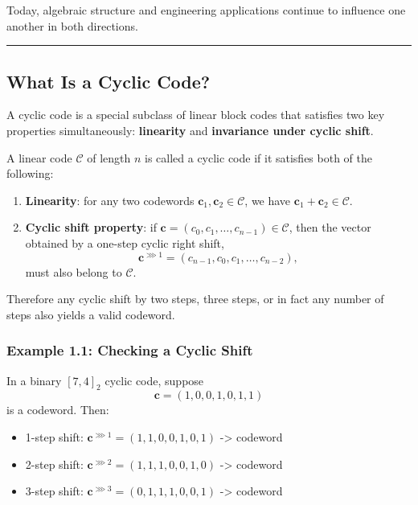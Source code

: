\documentclass[
]{article}
\providecommand{\tightlist}{%
  \setlength{\itemsep}{0pt}\setlength{\parskip}{0pt}}
\begin{document}
Today, algebraic structure and engineering applications continue to
influence one another in both directions.

\begin{center}\rule{0.5\linewidth}{0.5pt}\end{center}

\subsection{What Is a Cyclic Code?}\label{what-is-a-cyclic-code}

A cyclic code is a special subclass of linear block codes that satisfies
two key properties simultaneously: \textbf{linearity} and
\textbf{invariance under cyclic shift}.

A linear code \(\mathcal{C}\) of length \(n\) is called a cyclic code if
it satisfies both of the following:

\begin{enumerate}
\def\labelenumi{\arabic{enumi}.}
\tightlist
\item
  \textbf{Linearity}: for any two codewords
  \(\mathbf{c}_1, \mathbf{c}_2 \in \mathcal{C}\), we have
  \(\mathbf{c}_1 + \mathbf{c}_2 \in \mathcal{C}\).
\item
  \textbf{Cyclic shift property}: if
  \(\mathbf{c} = (c_0, c_1, \dots, c_{n-1}) \in \mathcal{C}\), then the
  vector obtained by a one-step cyclic right shift,
  \[\mathbf{c}^{\ggg 1} = (c_{n-1}, c_0, c_1, \dots, c_{n-2}),\] must
  also belong to \(\mathcal{C}\).
\end{enumerate}

Therefore any cyclic shift by two steps, three steps, or in fact any
number of steps also yields a valid codeword.

\subsubsection{Example 1.1: Checking a Cyclic
Shift}\label{example-1.1-checking-a-cyclic-shift}

In a binary \([7,4]_2\) cyclic code, suppose
\[\mathbf{c} = (1,0,0,1,0,1,1)\] is a codeword. Then:

\begin{itemize}
\tightlist
\item
  1-step shift: \(\mathbf{c}^{\ggg 1} = (1,1,0,0,1,0,1)\)
  -\textgreater{} codeword
\item
  2-step shift: \(\mathbf{c}^{\ggg 2} = (1,1,1,0,0,1,0)\)
  -\textgreater{} codeword
\item
  3-step shift: \(\mathbf{c}^{\ggg 3} = (0,1,1,1,0,0,1)\)
  -\textgreater{} codeword
\end{itemize}
\end{document}
